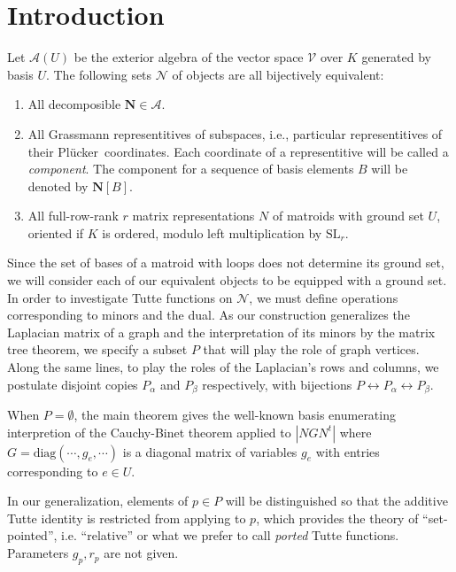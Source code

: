 \documentclass[Unicode]{cedram-alco}
\newcommand{\ext}[1]{\ensuremath{\mathbf{#1}}}
\newcommand{\Plucker}{Pl\"{u}cker\ }
\begin{document}
\section{Introduction}
Let $\mathcal{A}(U)$ be the exterior algebra of the vector space
$\mathcal{V}$ over $K$ generated by basis $U$.  The following
sets $\mathcal{N}$ of objects are all bijectively equivalent:
\begin{enumerate}
\item All decomposible $\ext{N}\in\mathcal{A}$.
\item All Grassmann representitives\cite{MarcusFDMuAlPt2} of subspaces,
  i.e., particular representitives of their \Plucker coordinates.
  Each coordinate of a representitive will be called a \emph{component}.
  The component
  for a sequence of basis elements $B$ will be denoted by $\ext{N}[B]$.
\item All full-row-rank $r$
  matrix representations $N$ of matroids with ground set $U$,
  oriented if $K$ is ordered, modulo left multiplication by
  $\text{SL}_r$.   
\end{enumerate}

Since the set of bases of a matroid with loops does not
determine its ground set, we will consider each of our equivalent
objects to be equipped with a ground set.  In order
to investigate Tutte functions on $\mathcal{N}$, we must
define operations corresponding to minors and the dual.
As our construction generalizes the Laplacian matrix of
a graph and the interpretation of its minors by the
matrix tree theorem\cite{sdcMTT},
we specify a subset $P$ that will play the role of graph vertices.
Along the same lines, to play the roles of the Laplacian's
rows and columns, we postulate disjoint copies $P_\alpha$ and
$P_\beta$ respectively, with bijections
$P \leftrightarrow P_{\alpha}\leftrightarrow P_{\beta}$.

When $P=\emptyset$, the main theorem gives the well-known
basis enumerating interpretion of the Cauchy-Binet theorem applied to
$|N G N^t|$
where $G=\text{diag}(\cdots, g_e , \cdots )$ is a diagonal matrix of variables
$g_e$ with entries corresponding to $e\in U$.

In our generalization, elements of $p\in P$ will be distinguished
so that the additive Tutte identity is restricted from applying
to $p$, which provides the theory of ``set-pointed''\cite{SetPointedLV},
i.e. ``relative''\cite{RelTuttePolyDiaoHetyei} or what we
prefer to call \emph{ported}\cite{sdcPorted,TutteEx}
Tutte functions.  Parameters $g_p, r_p$ are not given.
\end{document}
